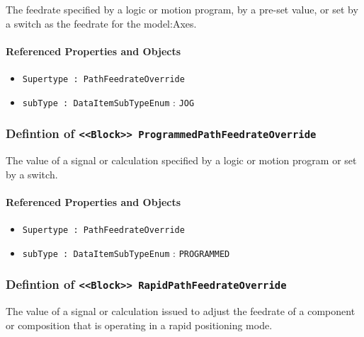 \FloatBarrier

The feedrate specified by a logic or motion program, by a pre-set value, or set by a switch as the feedrate for the {model:Axes}. 

\FloatBarrier
\paragraph{Referenced Properties and Objects}

\begin{itemize}
\item \texttt{Supertype : PathFeedrateOverride}

\item \texttt{subType : DataItemSubTypeEnum} : \texttt{JOG}

\end{itemize}
\FloatBarrier
\subsubsection{Defintion of \texttt{<<Block>> ProgrammedPathFeedrateOverride}}
  \label{type:ProgrammedPathFeedrateOverride}

\FloatBarrier

The value of a signal or calculation specified by a logic or motion program or set by a switch.

\FloatBarrier
\paragraph{Referenced Properties and Objects}

\begin{itemize}
\item \texttt{Supertype : PathFeedrateOverride}

\item \texttt{subType : DataItemSubTypeEnum} : \texttt{PROGRAMMED}

\end{itemize}
\FloatBarrier
\subsubsection{Defintion of \texttt{<<Block>> RapidPathFeedrateOverride}}
  \label{type:RapidPathFeedrateOverride}

\FloatBarrier

The value of a signal or calculation issued to adjust the feedrate of a component or composition that is operating in a rapid positioning mode.

